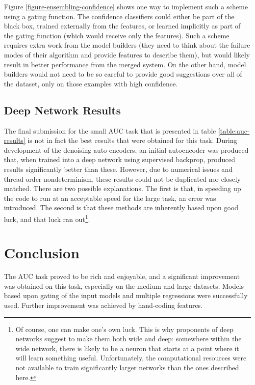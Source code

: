 \documentclass{article}
\begin{document}
Figure \ref{figure-ensembling-confidence} shows one way to implement such a scheme using a gating function.  The confidence classifiers could either be part of the black box, trained externally from the features, or learned implicitly as part of the gating function (which would receive only the features).  Such a scheme requires extra work from the model builders (they need to think about the failure modes of their algorithm and provide features to describe them), but would likely result in better performance from the merged system.  On the other hand, model builders would not need to be so careful to provide good suggestions over all of the dataset, only on those examples with high confidence.

\subsection{Deep Network Results}

The final submission for the small AUC task that is presented in table \ref{table:auc-results} is not in fact the best results that were obtained for this task.  During development of the denoising auto-encoders, an initial autoencoder was produced that, when trained into a deep network using supervised backprop, produced results significantly better than these.  However, due to numerical issues and thread-order nondeterminism, these results could not be duplicated nor closely matched.  There are two possible explanations.  The first is that, in speeding up the code to run at an acceptable speed for the large task, an error was introduced.  The second is that these methods are inherently based upon good luck, and that luck ran out\footnote{Of course, one can make one's own luck.  This is why proponents of deep networks suggest to make them both wide and deep: somewhere within the wide network, there is likely to be a neuron that starts at a point where it will learn something useful.  Unfortunately, the computational resources were not available to train significantly larger networks than the ones described here.}.

\section{Conclusion}

The AUC task proved to be rich and enjoyable, and a significant improvement was obtained on this task, especially on the medium and large datasets.  Models based upon gating of the input models and multiple regressions were successfully used.  Further improvement was achieved by hand-coding features.
\end{document}
